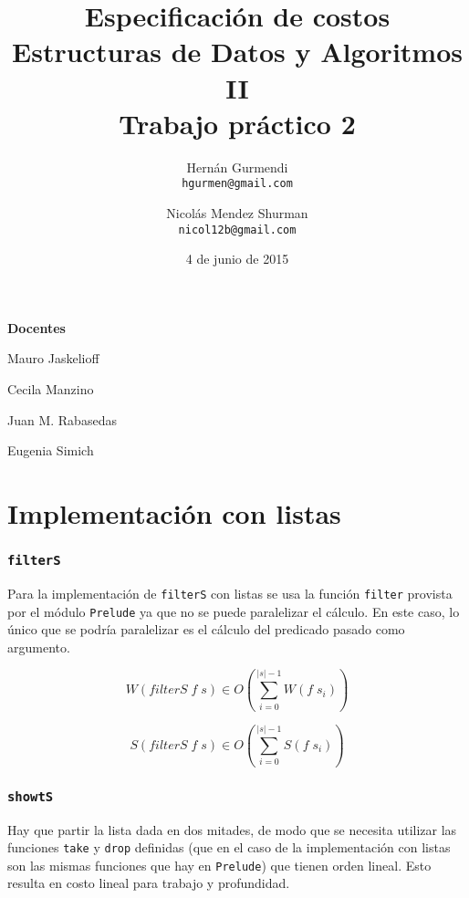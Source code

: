 \documentclass[a4paper,10pt]{article}
\author{
    Hernán Gurmendi \\
    \texttt{hgurmen@gmail.com}
    \and Nicolás Mendez Shurman \\
    \texttt{nicol12b@gmail.com}
}
\date{
    4 de junio de 2015
}
\title{
    \Huge Especificación de costos \\
    \Large Estructuras de Datos y Algoritmos II \\
    \large Trabajo práctico 2
}
\begin{document}
\maketitle

\begin{center}
\large \bf Docentes
\end{center}

\begin{center}
Mauro Jaskelioff

Cecila Manzino

Juan M. Rabasedas

Eugenia Simich
\end{center}

\newpage{}


\part*{Implementación con listas}


\section*{\texttt{filterS}}

Para la implementación de \texttt{filterS} con listas se usa la función
\texttt{filter} provista por el módulo \texttt{Prelude} ya que no se puede
paralelizar el cálculo. En este caso, lo único que se podría paralelizar es
el cálculo del predicado pasado como argumento.


\begin{equation*}
    W \left( filterS\; f \; s \right) \in
    O \left( \sum_{i=0}^{\vert s \vert -1} W(f \; s_i) \right)
\end{equation*}

\begin{equation*}
    S \left( filterS\; f \; s \right) \in
    O \left( \sum_{i=0}^{\vert s \vert -1} S(f \; s_i) \right)
\end{equation*}


\section*{\texttt{showtS}}

Hay que partir la lista dada en dos mitades, de modo que se necesita utilizar
las funciones \texttt{take} y \texttt{drop} definidas (que en el caso de la
implementación con listas son las mismas funciones que hay en \texttt{Prelude})
que tienen orden lineal. Esto resulta en costo lineal para trabajo y profundidad.
\end{document}

